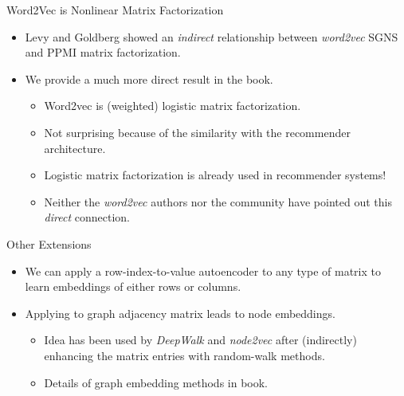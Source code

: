 \begin{frame}{Word2Vec is Nonlinear Matrix Factorization}
\begin{itemize}
\item Levy and Goldberg showed an {\em indirect} relationship
between {\em word2vec} SGNS  and PPMI matrix factorization.
\item We provide a much more direct result in the book.
\begin{itemize}
\item Word2vec is (weighted) logistic matrix factorization.
\item Not surprising because of the similarity with the recommender
architecture.
\item Logistic matrix factorization is already used in recommender
systems!
\item Neither the {\em word2vec} authors nor the community have
pointed out this {\em direct} connection.
\end{itemize}
\end{itemize}
\end{frame}


\begin{frame}{Other Extensions}
\begin{itemize}
\item We can apply a row-index-to-value autoencoder to any type of matrix to learn
embeddings of either rows or columns.
\item Applying to graph adjacency matrix leads to node embeddings.
\begin{itemize}
\item Idea has been used by {\em DeepWalk} and {\em node2vec} after
(indirectly) enhancing the matrix entries with random-walk methods.
\item Details of graph embedding methods in book.
\end{itemize}
\end{itemize}
\end{frame}











